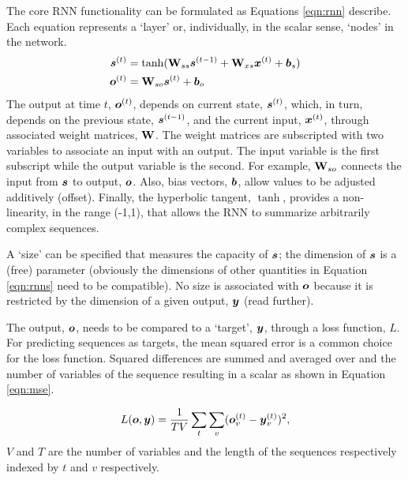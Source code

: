 The core RNN functionality can be formulated as Equations \ref{eqn:rnn} describe. Each equation represents a `layer' or, individually, in the scalar sense, `nodes' in the network.
\begin{subequations}  
  \label{eqn:rnn}
  \begin{align}
    \boldsymbol{s}\sp{(t)}&=
              \mathrm{\tanh}(
              \mathbf{W}_{ss}
              \boldsymbol{s}\sp{(t-1)}
              +
              \mathbf{W}_{xs}
              \boldsymbol{x}\sp{(t)}
              +
              \boldsymbol{b}_s
              ) 
              \label{eqn:rnns} \\ 
    \boldsymbol{o}\sp{(t)}&=
             \mathbf{W}_{so}
             \boldsymbol{s}\sp{(t)}
             +
             \boldsymbol{b}_{o}
             \label{eqn:rnno}
  \end{align}
\end{subequations}
\noindent 
The output at time $t$, $\boldsymbol{o}\sp{(t)}$, depends on current state, $\boldsymbol{s}\sp{(t)}$, which, in turn, depends on the previous state, $\boldsymbol{s}\sp{(t-1)}$, and the current input, $\boldsymbol{x}\sp{(t)}$, through associated weight matrices, $\mathbf{W}$. The weight matrices are subscripted with two variables to associate an input with an output. The input variable is the first subscript while the output variable is the second. For example, $\mathbf{W}_{so}$ connects the input from $\boldsymbol{s}$ to output, $\boldsymbol{o}$. Also, bias vectors, $\boldsymbol{b}$, allow values to be adjusted additively (offset). Finally, the hyperbolic tangent, $\tanh$, provides a non-linearity, in the range (-1,1), that allows the RNN to summarize arbitrarily complex sequences.

A `size' can be specified that measures the capacity of $\boldsymbol{s}$; the dimension of $\boldsymbol{s}$ is a (free) parameter (obviously the dimensions of other quantities in Equation \ref{eqn:rnns} need to be compatible).
%
No size is associated with $\boldsymbol{o}$ because it is restricted by the dimension of a given output, $\boldsymbol{y}$ (read further).

The output, $\boldsymbol{o}$, needs to be compared to a `target', $\boldsymbol{y}$, through a loss function, $L$. For predicting sequences as targets, the mean squared error is a common choice for the loss function. Squared differences are summed and averaged over and the number of variables of the sequence resulting in a scalar as shown in Equation \ref{eqn:mse}.

\begin{equation}
  \label{eqn:mse}
  L(\boldsymbol{o},\boldsymbol{y}) = \frac{1}{TV} \sum_t \sum_v(
  \boldsymbol{o}\sp{(t)}_v - \boldsymbol{y}\sp{(t)}_v
  )^2,
\end{equation}
\noindent
$V$ and $T$ are the number of variables and the length of the sequences respectively indexed by $t$ and $v$ respectively.

